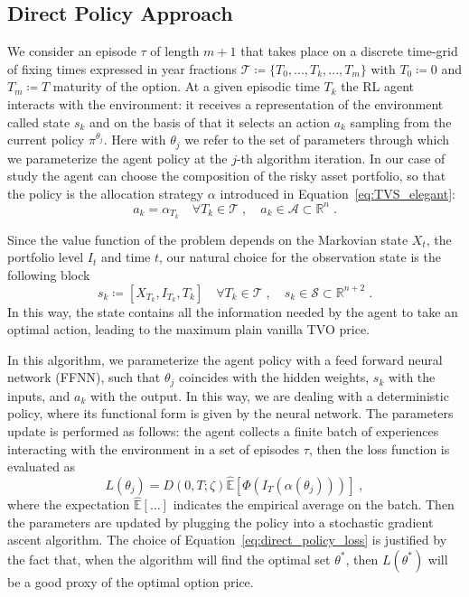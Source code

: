 \documentclass[11pt]{article}
\begin{document}
\subsection{Direct Policy Approach}\label{sec:direct_policy}
We consider an episode $\tau$ of length $m+1$ that takes place on a discrete time-grid of fixing times expressed in year fractions $\mathcal{T}\coloneqq \{T_0,...,T_k,...,T_m\}$ with $T_0\coloneqq 0$ and $T_m \coloneqq T$ maturity of the option. At a given episodic time $T_k$ the RL agent interacts with the environment: it receives a representation of the environment called state $s_k$ and on the basis of that it selects an action $a_k$ sampling from the current policy $\pi^{\theta_j}$. Here with $\theta_j$ we refer to the set of parameters through which we parameterize the agent policy at the $j$-th algorithm iteration. In our case of study the agent can choose the composition of the risky asset portfolio, so that the policy is the allocation strategy $\alpha$ introduced in Equation~\eqref{eq:TVS_elegant}:
\begin{equation}
 	a_k = \alpha_{T_k} \quad \forall T_k \in \mathcal{T} \; , \quad a_k \in \mathcal{A}\subset \mathbb{R}^n \; .
\label{eq:action}\end{equation} 

Since the value function of the problem depends on the Markovian state $X_t$, the portfolio level $I_t$ and time $t$, our natural choice for the observation state is the following block
\begin{equation}
 	s_{k} \coloneqq \left[X_{T_k}, I_{T_k}, T_k \right] \quad \forall T_k \in \mathcal{T} \; , \quad s_k \in \mathcal{S} \subset \mathbb{R}^{n+2} \; .
\label{eq:state}\end{equation}
In this way, the state contains all the information needed by the agent to take an optimal action, leading to the maximum plain vanilla TVO price. 

In this algorithm, we parameterize the agent policy with a feed forward neural network (FFNN), such that $\theta_j$ coincides with the hidden weights, $s_k$ with the inputs, and $a_k$ with the output. In this way, we are dealing with a deterministic policy, where its functional form is given by the neural network. The parameters update is performed as follows: the agent collects a finite batch of experiences interacting with the environment in a set of episodes $\tau$, then the loss function is evaluated as
\begin{equation}
L(\theta_j) = D(0,T;\zeta)\hat{\mathbb{E}}\left[ \Phi(I_T(\alpha(\theta_j))) \right] \; ,
\label{eq:direct_policy_loss}\end{equation}  
where the expectation $\hat{\mathbb{E}}[\dots]$ indicates the empirical average on the batch. Then the parameters are updated by plugging the policy into a stochastic gradient ascent algorithm. The choice of Equation~\eqref{eq:direct_policy_loss} is justified by the fact that, when the algorithm will find the optimal set $\theta^*$, then $L(\theta^*)$ will be a good proxy of the optimal option price. 
\end{document}
